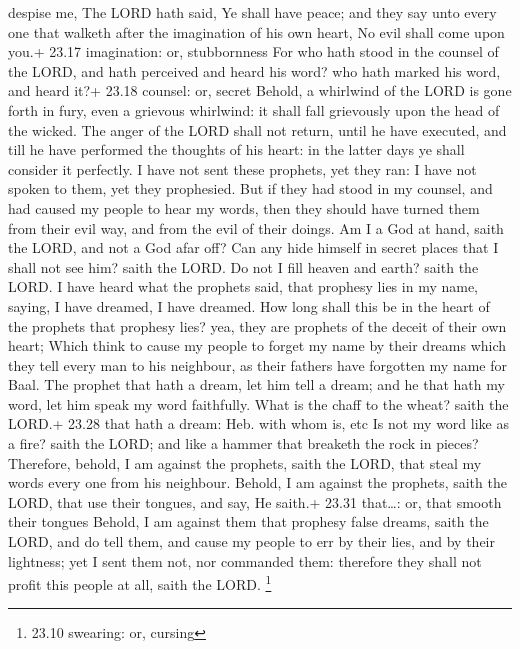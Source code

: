 despise me, The LORD hath said, Ye shall have peace; and they say unto
every one that walketh after the imagination of his own heart, No evil
shall come upon you.+ 23.17 imagination: or, stubbornness 
For who hath stood in the counsel of the LORD, and hath perceived and
heard his word? who hath marked his word, and heard it?+ 23.18 counsel:
or, secret  Behold, a whirlwind of the LORD is gone forth
in fury, even a grievous whirlwind: it shall fall grievously upon the
head of the wicked.  The anger of the LORD shall not
return, until he have executed, and till he have performed the thoughts
of his heart: in the latter days ye shall consider it perfectly.
 I have not sent these prophets, yet they ran: I have not
spoken to them, yet they prophesied.  But if they had stood
in my counsel, and had caused my people to hear my words, then they
should have turned them from their evil way, and from the evil of their
doings.  Am I a God at hand, saith the LORD, and not a God
afar off?  Can any hide himself in secret places that I
shall not see him? saith the LORD. Do not I fill heaven and earth? saith
the LORD.  I have heard what the prophets said, that
prophesy lies in my name, saying, I have dreamed, I have dreamed.
 How long shall this be in the heart of the prophets that
prophesy lies? yea, they are prophets of the deceit of their own heart;
 Which think to cause my people to forget my name by their
dreams which they tell every man to his neighbour, as their fathers have
forgotten my name for Baal.  The prophet that hath a dream,
let him tell a dream; and he that hath my word, let him speak my word
faithfully. What is the chaff to the wheat? saith the LORD.+ 23.28 that
hath a dream: Heb. with whom is, etc  Is not my word like
as a fire? saith the LORD; and like a hammer that breaketh the rock in
pieces?  Therefore, behold, I am against the prophets,
saith the LORD, that steal my words every one from his neighbour.
 Behold, I am against the prophets, saith the LORD, that
use their tongues, and say, He saith.+ 23.31 that\ldots: or, that smooth
their tongues  Behold, I am against them that prophesy
false dreams, saith the LORD, and do tell them, and cause my people to
err by their lies, and by their lightness; yet I sent them not, nor
commanded them: therefore they shall not profit this people at all,
saith the LORD. \footnote{23.10 swearing: or, cursing}


